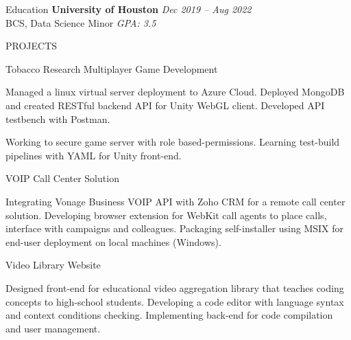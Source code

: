 \documentclass{resume} %
\begin{document}

\begin{rSection}{Education}
	{\bf University of Houston} \hfill {\em Dec 2019 -- Aug 2022}\\
	{ BCS, Data Science Minor} \hfill {\em GPA: 3.5}\\
\end{rSection}


\begin{rSection}{PROJECTS}
	\begin{rSubsection}{Tobacco Research Multiplayer Game Development}{}{}{}
		\item Managed a linux virtual server deployment to Azure Cloud. Deployed MongoDB and created RESTful backend API for Unity WebGL client. Developed API testbench with Postman.
		\item Working to secure game server with role based-permissions. Learning test-build pipelines with YAML for Unity front-end.
	\end{rSubsection}
	\begin{rSubsection}{VOIP Call Center Solution}{}{}{}
		\item Integrating Vonage Business VOIP API with Zoho CRM for a remote call center solution. Developing browser extension for WebKit call agents to place calls, interface with campaigns and colleagues. Packaging self-installer using MSIX for end-user deployment on local machines (Windows).
	\end{rSubsection}
	\begin{rSubsection}{Video Library Website}{}{}{}
		\item Designed front-end for educational video aggregation library that teaches coding concepts to high-school students. Developing a code editor with language syntax and context conditions checking. Implementing back-end for code compilation and user management.
	\end{rSubsection}
\end{rSection}

\end{document}
